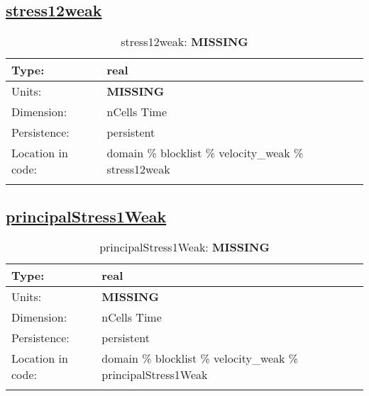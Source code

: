 \subsection[stress12weak]{\hyperref[sec:var_tab_velocity_weak]{stress12weak}}
\label{subsec:var_sec_velocity_weak_stress12weak}
\begin{center}
\begin{longtable}{| p{2.0in} | p{4.0in} |}
        \hline 
        Type: & real \\
        \hline 
        Units: & {\bf \color{red} MISSING} \\
        \hline 
        Dimension: & nCells Time \\
        \hline 
        Persistence: & persistent \\
        \hline 
         Location in code: & domain \% blocklist \% velocity\_weak \% stress12weak \\
         \hline 
    \caption{stress12weak: {\bf \color{red} MISSING}}
\end{longtable}
\end{center}
\subsection[principalStress1Weak]{\hyperref[sec:var_tab_velocity_weak]{principalStress1Weak}}
\label{subsec:var_sec_velocity_weak_principalStress1Weak}
\begin{center}
\begin{longtable}{| p{2.0in} | p{4.0in} |}
        \hline 
        Type: & real \\
        \hline 
        Units: & {\bf \color{red} MISSING} \\
        \hline 
        Dimension: & nCells Time \\
        \hline 
        Persistence: & persistent \\
        \hline 
         Location in code: & domain \% blocklist \% velocity\_weak \% principalStress1Weak \\
         \hline 
    \caption{principalStress1Weak: {\bf \color{red} MISSING}}
\end{longtable}
\end{center}
